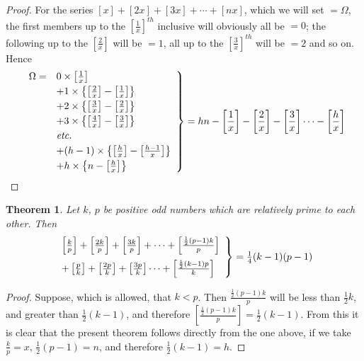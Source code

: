 \documentclass{book}
\theoremstyle{plain}
\newtheorem*{theorem}{Theorem}
\theoremstyle{remark}
\begin{document}
\begin{proof} For the series $[x] + [2x] + [3x] + \cdots + [nx]$, which we will set $= \Omega$, the first members up to the $\left[\frac{1}{x}\right]^{th}$ inclusive will obviously all be $=0$; the following up to the $\left[\frac{2}{x}\right]$ will be $=1$, all up to the $[\frac{3}{x}]^{th}$ will be $=2$ and so on.  Hence 
\[ \left. \begin{array}{rl} \Omega = & 0 \times \left[\frac{1}{x}\right] \vspace{1mm} \\
& + 1 \times \left\{ \left[\frac{2}{x}\right] - \left[\frac{1}{x}\right] \right\} \vspace{1mm} \\
& + 2 \times \left\{ \left[\frac{3}{x}\right] - \left[\frac{2}{x}\right] \right\}\vspace{1mm}  \\
& + 3 \times \left\{ \left[\frac{4}{x}\right] - \left[\frac{3}{x}\right] \right\}\vspace{1mm}  \\
& \textit{etc.}\vspace{1mm}  \\ 
& + (h-1) \times \left\{ \left[\frac{h}{x}\right] - \left[\frac{h-1}{x}\right] \right\} \vspace{1mm} \\
& + h \times \left\{ n - \left[\frac{h}{x}\right] \right\} \end{array} \right\} = hn - \left[\frac{1}{x}\right] - \left[\frac{2}{x}\right]- \left[\frac{3}{x}\right] \cdots - \left[\frac{h}{x}\right] \]
\end{proof} 

\begin{theorem} Let $k$, $p$ be positive odd numbers which are relatively prime to each other.  Then 
\[ \left. \begin{array}{l} \left[\frac{k}{p}\right] + \left[\frac{2k}{p}\right] + \left[\frac{3k}{p}\right] + \cdots + \left[\frac{\frac{1}{2}(p-1)k}{p}\right] \vspace{2mm} \\
+ \left[\frac{p}{k}\right] + \left[\frac{2p}{k}\right] + \left[\frac{3p}{k}\right]  \cdots + \left[\frac{\frac{1}{2}(k-1)p}{k}\right] \end{array} \right\} = \tfrac{1}{4}(k-1)(p-1) \]
\end{theorem}
\begin{proof} Suppose, which is allowed, that $k<p$.  Then $\frac{\frac{1}{2}(p-1)k}{p}$ will be less than $\frac{1}{2}k$, and greater than $\frac{1}{2}(k-1)$, and therefore $\left[\frac{ \frac{1}{2}(p-1)k}{p}\right] = \tfrac{1}{2}(k-1)$.  From this it is clear that the present theorem follows directly from the one above, if we take $\frac{k}{p} = x$, $\frac{1}{2}(p-1) = n$, and therefore $\tfrac{1}{2}(k-1) = h$. \end{proof}
\end{document}
